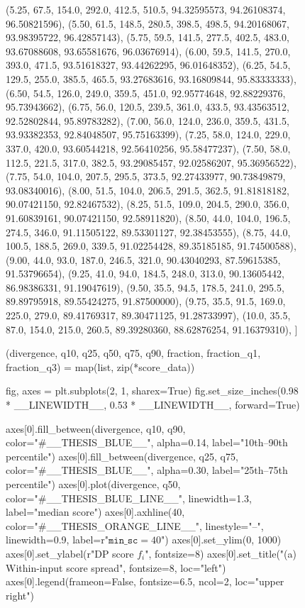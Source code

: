 \begin{figure}[H]
\begin{CacheMeCode}
    (5.25, 67.5, 154.0, 292.0, 412.5, 510.5, 94.32595573, 94.26108374, 96.50821596),
    (5.50, 61.5, 148.5, 280.5, 398.5, 498.5, 94.20168067, 93.98395722, 96.42857143),
    (5.75, 59.5, 141.5, 277.5, 402.5, 483.0, 93.67088608, 93.65581676, 96.03676914),
    (6.00, 59.5, 141.5, 270.0, 393.0, 471.5, 93.51618327, 93.44262295, 96.01648352),
    (6.25, 54.5, 129.5, 255.0, 385.5, 465.5, 93.27683616, 93.16809844, 95.83333333),
    (6.50, 54.5, 126.0, 249.0, 359.5, 451.0, 92.95774648, 92.88229376, 95.73943662),
    (6.75, 56.0, 120.5, 239.5, 361.0, 433.5, 93.43563512, 92.52802844, 95.89783282),
    (7.00, 56.0, 124.0, 236.0, 359.5, 431.5, 93.93382353, 92.84048507, 95.75163399),
    (7.25, 58.0, 124.0, 229.0, 337.0, 420.0, 93.60544218, 92.56410256, 95.58477237),
    (7.50, 58.0, 112.5, 221.5, 317.0, 382.5, 93.29085457, 92.02586207, 95.36956522),
    (7.75, 54.0, 104.0, 207.5, 295.5, 373.5, 92.27433977, 90.73849879, 93.08340016),
    (8.00, 51.5, 104.0, 206.5, 291.5, 362.5, 91.81818182, 90.07421150, 92.82467532),
    (8.25, 51.5, 109.0, 204.5, 290.0, 356.0, 91.60839161, 90.07421150, 92.58911820),
    (8.50, 44.0, 104.0, 196.5, 274.5, 346.0, 91.11505122, 89.53301127, 92.38453555),
    (8.75, 44.0, 100.5, 188.5, 269.0, 339.5, 91.02254428, 89.35185185, 91.74500588),
    (9.00, 44.0, 93.0, 187.0, 246.5, 321.0, 90.43040293, 87.59615385, 91.53796654),
    (9.25, 41.0, 94.0, 184.5, 248.0, 313.0, 90.13605442, 86.98386331, 91.19047619),
    (9.50, 35.5, 94.5, 178.5, 241.0, 295.5, 89.89795918, 89.55424275, 91.87500000),
    (9.75, 35.5, 91.5, 169.0, 225.0, 279.0, 89.41769317, 89.30471125, 91.28733997),
    (10.0, 35.5, 87.0, 154.0, 215.0, 260.5, 89.39280360, 88.62876254, 91.16379310),
]

(divergence, q10, q25, q50, q75, q90,
 fraction, fraction_q1, fraction_q3) = map(list, zip(*score_data))

fig, axes = plt.subplots(2, 1, sharex=True)
fig.set_size_inches(0.98 * __LINEWIDTH__, 0.53 * __LINEWIDTH__, forward=True)

axes[0].fill_between(divergence, q10, q90, color="#__THESIS_BLUE__", alpha=0.14,
                     label="10th--90th percentile")
axes[0].fill_between(divergence, q25, q75, color="#__THESIS_BLUE__", alpha=0.30,
                     label="25th--75th percentile")
axes[0].plot(divergence, q50, color="#__THESIS_BLUE_LINE__", linewidth=1.3,
             label="median score")
axes[0].axhline(40, color="#__THESIS_ORANGE_LINE__", linestyle="--", linewidth=0.9,
                label=r"$\mathtt{min\_sc}=40$")
axes[0].set_ylim(0, 1000)
axes[0].set_ylabel(r"DP score $f_i$", fontsize=8)
axes[0].set_title("(a) Within-input score spread", fontsize=8, loc="left")
axes[0].legend(frameon=False, fontsize=6.5, ncol=2, loc="upper right")


\end{CacheMeCode}
\end{figure}
